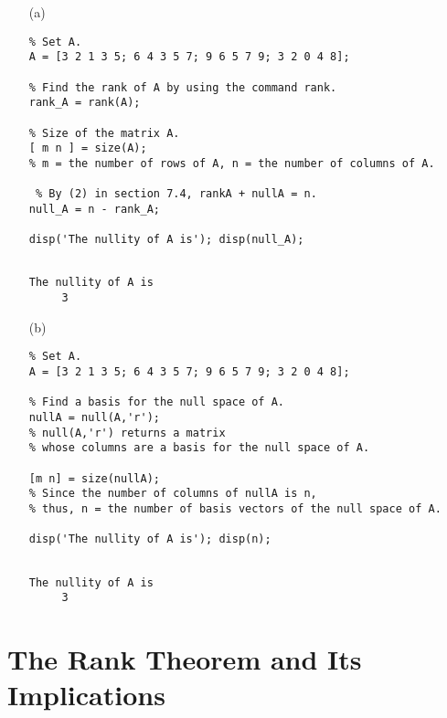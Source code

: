\begin{sol}
\verb""
\begin{itemize}


\item[(a)]

\begin{verbatim}
% Set A.
A = [3 2 1 3 5; 6 4 3 5 7; 9 6 5 7 9; 3 2 0 4 8]; 

% Find the rank of A by using the command rank.
rank_A = rank(A); 

% Size of the matrix A.
[ m n ] = size(A); 
% m = the number of rows of A, n = the number of columns of A.

 % By (2) in section 7.4, rankA + nullA = n.
null_A = n - rank_A;

disp('The nullity of A is'); disp(null_A);
\end{verbatim}

\begin{outputs}
\begin{verbatim}

The nullity of A is
     3
\end{verbatim}
\end{outputs}


\item[(b)]
\begin{verbatim}
% Set A.
A = [3 2 1 3 5; 6 4 3 5 7; 9 6 5 7 9; 3 2 0 4 8]; 

% Find a basis for the null space of A.
nullA = null(A,'r'); 
% null(A,'r') returns a matrix 
% whose columns are a basis for the null space of A.

[m n] = size(nullA);
% Since the number of columns of nullA is n,
% thus, n = the number of basis vectors of the null space of A.

disp('The nullity of A is'); disp(n);
\end{verbatim}


\begin{outputs}
\begin{verbatim}

The nullity of A is
     3
\end{verbatim}
\end{outputs}





\end{itemize}

\end{sol}




\section{The Rank Theorem and Its Implications}

